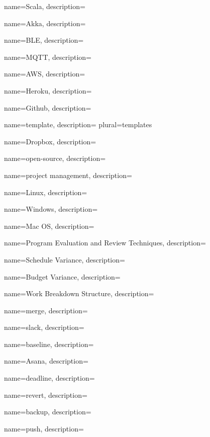 {
	name=Scala,
	description={\TODO{}}
}

 {
	name=Akka,
	description={\TODO{}}
}

 {
	name=BLE,
	description={\TODO{}}
}

 {
	name=MQTT,
	description={\TODO{}}
}

 {
	name=AWS,
	description={\TODO{}}
}

 {
	name=Heroku,
	description={\TODO{}}
}

 {
	name=Github,
	description={\TODO{}}
}

 {
	name=template,
	description={\TODO{}}
	plural=templates
}

 {
	name=Dropbox,
	description={\TODO{}}
}

 {
	name=open-source,
	description={\TODO{}}
}

 {
	name=project management,
	description={\TODO{}}
}

 {
	name=Linux,
	description={\TODO{}}
}

 {
	name=Windows,
	description={\TODO{}}
}

 {
	name=Mac OS,
	description={\TODO{}}
}

 {
	name=Program Evaluation and Review Techniques,
	description={\TODO{}}
}

 {
	name=Schedule Variance,
	description={\TODO{}}
}

 {
	name=Budget Variance,
	description={\TODO{}}
}

 {
	name=Work Breakdown Structure,
	description={\TODO{}}
}

 {
	name=merge,
	description={\TODO{}}
}

 {
	name=slack,
	description={\TODO{}}
}

 {
	name=baseline,
	description={\TODO{}}
}

 {
	name=Asana,
	description={\TODO{}}
}

 {
	name=deadline,
	description={\TODO{}}
}

 {
	name=revert,
	description={\TODO{}}
}

 {
	name=backup,
	description={\TODO{}}
}

 {
	name=push,
	description={\TODO{}}
}